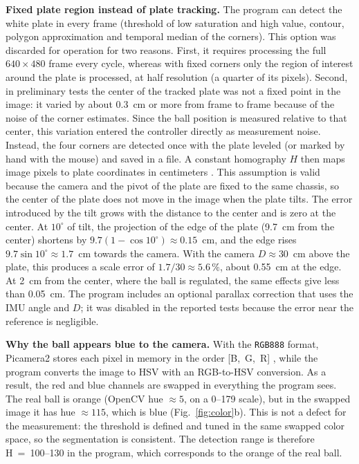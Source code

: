 \documentclass[11pt,letterpaper]{article}
\begin{document}
\textbf{Fixed plate region instead of plate tracking.} The program can
detect the white plate in every frame (threshold of low saturation and
high value, contour, polygon approximation and temporal median of the
corners). This option was discarded for operation for two reasons.
First, it requires processing the full $640\times480$ frame every cycle,
whereas with fixed corners only the region of interest around the plate
is processed, at half resolution (a quarter of its pixels). Second, in
preliminary tests the center of the tracked plate was not a fixed point
in the image: it varied by about 0.3~cm or more from frame to frame
because of the noise of the corner estimates. Since the ball position
is measured relative to that center, this variation entered the
controller directly as measurement noise. Instead, the four corners are
detected once with the plate leveled (or marked by hand with the mouse)
and saved in a file. A constant homography $H$ then maps image pixels to
plate coordinates in centimeters \cite{Hartley2004}. This assumption is
valid because the camera and the pivot of the plate are fixed to the
same chassis, so the center of the plate does not move in the image when
the plate tilts. The error introduced by the tilt grows with the
distance to the center and is zero at the center. At $10^\circ$ of
tilt, the projection of the edge of the plate (9.7~cm from the center)
shortens by $9.7(1-\cos 10^\circ)\approx0.15$~cm, and the edge rises
$9.7\sin 10^\circ \approx 1.7$~cm towards the camera. With the camera
$D\approx30$~cm above the plate, this produces a scale error of
$1.7/30\approx5.6\,\%$, about 0.55~cm at the edge. At 2~cm from the
center, where the ball is regulated, the same effects give less than
0.05~cm. The program includes an optional parallax correction that uses
the IMU angle and $D$; it was disabled in the reported tests because the
error near the reference is negligible.

\textbf{Why the ball appears blue to the camera.} With the
\texttt{RGB888} format, Picamera2 stores each pixel in memory in the
order [B,~G,~R] \cite{Picamera2}, while the program converts the image
to HSV with an RGB-to-HSV conversion. As a result, the red and blue
channels are swapped in everything the program sees. The real ball is
orange (OpenCV hue $\approx 5$, on a 0--179 scale), but in the swapped
image it has hue $\approx 115$, which is blue (Fig.~\ref{fig:color}b).
This is not a defect for the measurement: the threshold is defined and
tuned in the same swapped color space, so the segmentation is
consistent. The detection range is therefore H~=~100--130 in the
program, which corresponds to the orange of the real ball.
\end{document}
